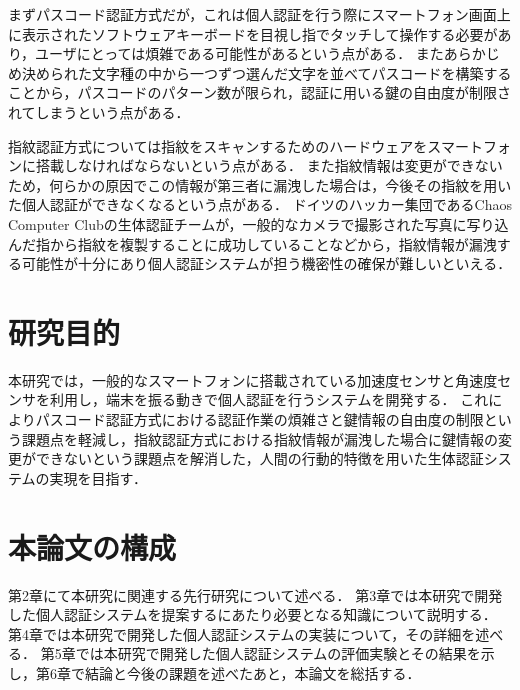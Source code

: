 まずパスコード認証方式だが，これは個人認証を行う際にスマートフォン画面上に表示されたソフトウェアキーボードを目視し指でタッチして操作する必要があり，ユーザにとっては煩雑である可能性があるという点がある．
またあらかじめ決められた文字種の中から一つずつ選んだ文字を並べてパスコードを構築することから，パスコードのパターン数が限られ，認証に用いる鍵の自由度が制限されてしまうという点がある．

指紋認証方式については指紋をスキャンするためのハードウェアをスマートフォンに搭載しなければならないという点がある．
また指紋情報は変更ができないため，何らかの原因でこの情報が第三者に漏洩した場合は，今後その指紋を用いた個人認証ができなくなるという点がある．
ドイツのハッカー集団であるChaos Computer Clubの生体認証チームが，一般的なカメラで撮影された写真に写り込んだ指から指紋を複製することに成功している\cite{1-ccc}ことなどから，指紋情報が漏洩する可能性が十分にあり個人認証システムが担う機密性の確保が難しいといえる\cite{1-sophos}．

\section{研究目的}
本研究では，一般的なスマートフォンに搭載されている加速度センサと角速度センサを利用し，端末を振る動きで個人認証を行うシステムを開発する．
これによりパスコード認証方式における認証作業の煩雑さと鍵情報の自由度の制限という課題点を軽減し，指紋認証方式における指紋情報が漏洩した場合に鍵情報の変更ができないという課題点を解消した，人間の行動的特徴を用いた生体認証システムの実現を目指す．

\section{本論文の構成}
第2章にて本研究に関連する先行研究について述べる．
第3章では本研究で開発した個人認証システムを提案するにあたり必要となる知識について説明する．
第4章では本研究で開発した個人認証システムの実装について，その詳細を述べる．
第5章では本研究で開発した個人認証システムの評価実験とその結果を示し，第6章で結論と今後の課題を述べたあと，本論文を総括する．
